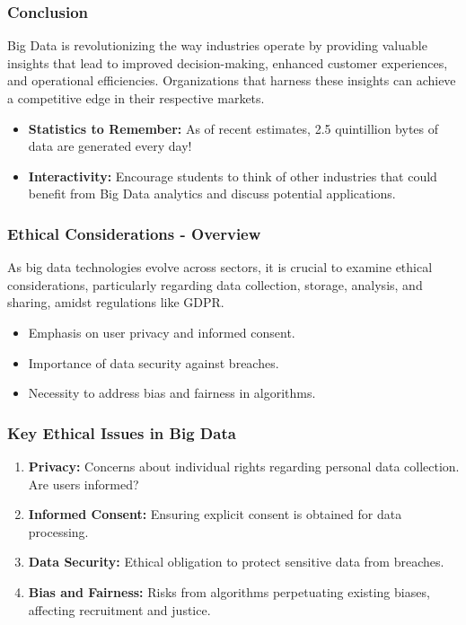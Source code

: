 \documentclass[aspectratio=169]{beamer}
\begin{document}
\begin{frame}[fragile]
    \frametitle{Conclusion}
    Big Data is revolutionizing the way industries operate by providing valuable insights that lead to improved decision-making, enhanced customer experiences, and operational efficiencies. Organizations that harness these insights can achieve a competitive edge in their respective markets.

    \begin{itemize}
        \item \textbf{Statistics to Remember:} 
        As of recent estimates, 2.5 quintillion bytes of data are generated every day!
        
        \item \textbf{Interactivity:} 
        Encourage students to think of other industries that could benefit from Big Data analytics and discuss potential applications.
    \end{itemize}
\end{frame}

\begin{frame}[fragile]
    \frametitle{Ethical Considerations - Overview}
    As big data technologies evolve across sectors, it is crucial to examine ethical considerations, particularly regarding data collection, storage, analysis, and sharing, amidst regulations like GDPR.
    
    \begin{itemize}
        \item Emphasis on user privacy and informed consent.
        \item Importance of data security against breaches.
        \item Necessity to address bias and fairness in algorithms.
    \end{itemize}
\end{frame}

\begin{frame}[fragile]
    \frametitle{Key Ethical Issues in Big Data}
    \begin{enumerate}
        \item \textbf{Privacy:} Concerns about individual rights regarding personal data collection. Are users informed?
        \item \textbf{Informed Consent:} Ensuring explicit consent is obtained for data processing.
        \item \textbf{Data Security:} Ethical obligation to protect sensitive data from breaches.
        \item \textbf{Bias and Fairness:} Risks from algorithms perpetuating existing biases, affecting recruitment and justice.
    \end{enumerate}
\end{frame}
\end{document}
